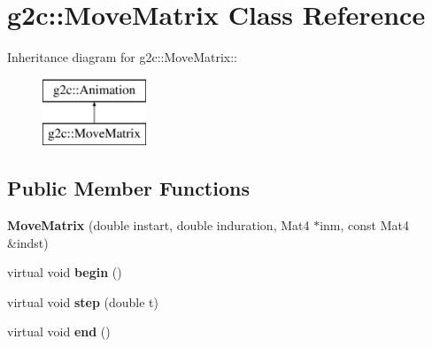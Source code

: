 \hypertarget{classg2c_1_1_move_matrix}{
\section{g2c::MoveMatrix Class Reference}
\label{classg2c_1_1_move_matrix}
}
Inheritance diagram for g2c::MoveMatrix::\begin{figure}[H]
\begin{center}
\leavevmode
\includegraphics[height=2cm]{classg2c_1_1_move_matrix}
\end{center}
\end{figure}
\subsection*{Public Member Functions}
\begin{DoxyCompactItemize}
\item 
\hypertarget{classg2c_1_1_move_matrix_a6758418174891c8811a5097abddcc9cf}{
{\bfseries MoveMatrix} (double instart, double induration, Mat4 $\ast$inm, const Mat4 \&indst)}
\label{classg2c_1_1_move_matrix_a6758418174891c8811a5097abddcc9cf}

\item 
\hypertarget{classg2c_1_1_move_matrix_ad8adb4906302730891e35cd3ca479ddc}{
virtual void {\bfseries begin} ()}
\label{classg2c_1_1_move_matrix_ad8adb4906302730891e35cd3ca479ddc}

\item 
\hypertarget{classg2c_1_1_move_matrix_a6332271935a779775608173bd2e43d93}{
virtual void {\bfseries step} (double t)}
\label{classg2c_1_1_move_matrix_a6332271935a779775608173bd2e43d93}

\item 
\hypertarget{classg2c_1_1_move_matrix_a317c86c003346c0960333a2b060262be}{
virtual void {\bfseries end} ()}
\label{classg2c_1_1_move_matrix_a317c86c003346c0960333a2b060262be}

\end{DoxyCompactItemize}
